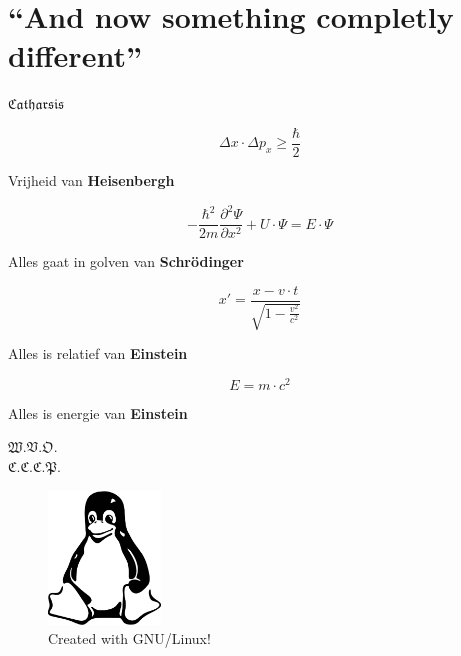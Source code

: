\documentclass[titlepage,a4paper,twoside]{article}
\begin{document}
\section*{``And now something completly different''}
\begin{centering}
$\mathfrak{Catharsis}$
\end{centering}
\[
\Delta x\cdot\Delta p_x\geq\displaystyle\frac{\hbar}{2}
\]
\begin{flushright}
Vrijheid van \textbf{Heisenbergh}
\end{flushright}
\[
-\displaystyle\frac{\hbar^2}{2m}\displaystyle\frac{\partial^2\Psi}{\partial x^2}+U\cdot\Psi=E\cdot\Psi
\]
\begin{flushright}
Alles gaat in golven van \textbf{Schrödinger}
\end{flushright}
\[
x'=\displaystyle\frac{x-v\cdot t}{\sqrt{1-\displaystyle\frac{v^2}{c^2}}}
\]
\begin{flushright}
Alles is relatief van \textbf{Einstein}
\end{flushright}
\[
E=m\cdot c^2
\]
\begin{flushright}
Alles is energie van \textbf{Einstein}
\end{flushright}
$\mathfrak{W.V.O.}$\\
$\mathfrak{C.C.C.P.}$
\begin{figure}[b]
\centering
\includegraphics[width=3cm]{tux.pdf}
\caption{Created with GNU/Linux!}
\end{figure}
\end{document}
